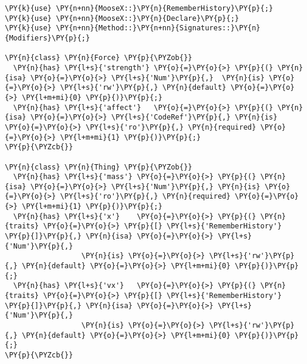 \begin{Verbatim}[commandchars=\\\{\}]
\PY{k}{use} \PY{n+nn}{MooseX::}\PY{n}{RememberHistory}\PY{p}{;}
\PY{k}{use} \PY{n+nn}{MooseX::}\PY{n}{Declare}\PY{p}{;}
\PY{k}{use} \PY{n+nn}{Method::}\PY{n+nn}{Signatures::}\PY{n}{Modifiers}\PY{p}{;}

\PY{n}{class} \PY{n}{Force} \PY{p}{\PYZob{}}
  \PY{n}{has} \PY{l+s}{'strength'} \PY{o}{=}\PY{o}{>} \PY{p}{(} \PY{n}{isa} \PY{o}{=}\PY{o}{>} \PY{l+s}{'Num'}\PY{p}{,}  \PY{n}{is} \PY{o}{=}\PY{o}{>} \PY{l+s}{'rw'}\PY{p}{,} \PY{n}{default} \PY{o}{=}\PY{o}{>} \PY{l+m+mi}{0} \PY{p}{)}\PY{p}{;}
  \PY{n}{has} \PY{l+s}{'affect'}   \PY{o}{=}\PY{o}{>} \PY{p}{(} \PY{n}{isa} \PY{o}{=}\PY{o}{>} \PY{l+s}{'CodeRef'}\PY{p}{,} \PY{n}{is} \PY{o}{=}\PY{o}{>} \PY{l+s}{'ro'}\PY{p}{,} \PY{n}{required} \PY{o}{=}\PY{o}{>} \PY{l+m+mi}{1} \PY{p}{)}\PY{p}{;} 
\PY{p}{\PYZcb{}}

\PY{n}{class} \PY{n}{Thing} \PY{p}{\PYZob{}}
  \PY{n}{has} \PY{l+s}{'mass'} \PY{o}{=}\PY{o}{>} \PY{p}{(} \PY{n}{isa} \PY{o}{=}\PY{o}{>} \PY{l+s}{'Num'}\PY{p}{,} \PY{n}{is} \PY{o}{=}\PY{o}{>} \PY{l+s}{'ro'}\PY{p}{,} \PY{n}{required} \PY{o}{=}\PY{o}{>} \PY{l+m+mi}{1} \PY{p}{)}\PY{p}{;}
  \PY{n}{has} \PY{l+s}{'x'}    \PY{o}{=}\PY{o}{>} \PY{p}{(} \PY{n}{traits} \PY{o}{=}\PY{o}{>} \PY{p}{[} \PY{l+s}{'RememberHistory'} \PY{p}{]}\PY{p}{,} \PY{n}{isa} \PY{o}{=}\PY{o}{>} \PY{l+s}{'Num'}\PY{p}{,} 
                  \PY{n}{is} \PY{o}{=}\PY{o}{>} \PY{l+s}{'rw'}\PY{p}{,} \PY{n}{default} \PY{o}{=}\PY{o}{>} \PY{l+m+mi}{0} \PY{p}{)}\PY{p}{;}
  \PY{n}{has} \PY{l+s}{'vx'}   \PY{o}{=}\PY{o}{>} \PY{p}{(} \PY{n}{traits} \PY{o}{=}\PY{o}{>} \PY{p}{[} \PY{l+s}{'RememberHistory'} \PY{p}{]}\PY{p}{,} \PY{n}{isa} \PY{o}{=}\PY{o}{>} \PY{l+s}{'Num'}\PY{p}{,}
                  \PY{n}{is} \PY{o}{=}\PY{o}{>} \PY{l+s}{'rw'}\PY{p}{,} \PY{n}{default} \PY{o}{=}\PY{o}{>} \PY{l+m+mi}{0} \PY{p}{)}\PY{p}{;}
\PY{p}{\PYZcb{}}
\end{Verbatim}
